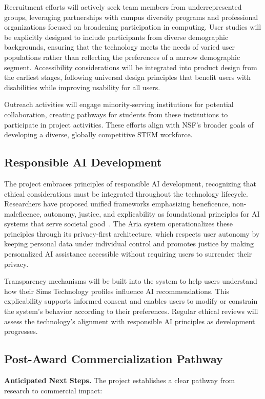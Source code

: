 \documentclass[11pt]{article}
\begin{document}
Recruitment efforts will actively seek team members from underrepresented groups, 
leveraging partnerships with campus diversity programs and professional 
organizations focused on broadening participation in computing. User studies will 
be explicitly designed to include participants from diverse demographic 
backgrounds, ensuring that the technology meets the needs of varied user 
populations rather than reflecting the preferences of a narrow demographic 
segment. Accessibility considerations will be integrated into product design from 
the earliest stages, following universal design principles that benefit users 
with disabilities while improving usability for all users.

Outreach activities will engage minority-serving institutions for potential 
collaboration, creating pathways for students from these institutions to 
participate in project activities. These efforts align with NSF's broader goals 
of developing a diverse, globally competitive STEM workforce.

\vspace*{-8pt}
\subsection{Responsible AI Development}
\vspace*{-8pt}
The project embraces principles of responsible AI development, recognizing that 
ethical considerations must be integrated throughout the technology lifecycle. 
Researchers have proposed unified frameworks emphasizing beneficence, 
non-maleficence, autonomy, justice, and explicability as foundational principles 
for AI systems that serve societal good~\cite{floridi2019unified}. The Aria 
system operationalizes these principles through its privacy-first architecture, 
which respects user autonomy by keeping personal data under individual control 
and promotes justice by making personalized AI assistance accessible without 
requiring users to surrender their privacy.

Transparency mechanisms will be built into the system to help users understand 
how their Sims Technology profiles influence AI recommendations. This 
explicability supports informed consent and enables users to modify or constrain 
the system's behavior according to their preferences. Regular ethical reviews 
will assess the technology's alignment with responsible AI principles as 
development progresses.

\vspace*{-8pt}
\subsection{Post-Award Commercialization Pathway}
\vspace*{-8pt}
\textbf{Anticipated Next Steps.}
The project establishes a clear pathway from research to commercial impact:
\end{document}
